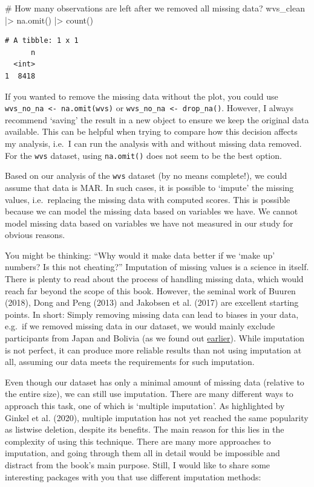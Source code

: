 \documentclass[
  letterpaper,
  DIV=11,
  numbers=noendperiod]{scrreprt}
\newenvironment{Shaded}{\begin{snugshade}}{\end{snugshade}}
\newcommand{\CommentTok}[1]{\textcolor[rgb]{0.37,0.37,0.37}{#1}}
\newcommand{\FunctionTok}[1]{\textcolor[rgb]{0.28,0.35,0.67}{#1}}
\newcommand{\NormalTok}[1]{\textcolor[rgb]{0.00,0.23,0.31}{#1}}
\newcommand{\SpecialCharTok}[1]{\textcolor[rgb]{0.37,0.37,0.37}{#1}}
\begin{document}
\begin{Shaded}
\begin{Highlighting}[]
\CommentTok{\# How many observations are left after we removed all missing data?}
\NormalTok{wvs\_clean }\SpecialCharTok{|\textgreater{}} \FunctionTok{na.omit}\NormalTok{() }\SpecialCharTok{|\textgreater{}} \FunctionTok{count}\NormalTok{()}
\end{Highlighting}
\end{Shaded}

\begin{verbatim}
# A tibble: 1 x 1
      n
  <int>
1  8418
\end{verbatim}

If you wanted to remove the missing data without the plot, you could use
\texttt{wvs\_no\_na\ \textless{}-\ na.omit(wvs)} or
\texttt{wvs\_no\_na\ \textless{}-\ drop\_na()}. However, I always
recommend `saving' the result in a new object to ensure we keep the
original data available. This can be helpful when trying to compare how
this decision affects my analysis, i.e.~I can run the analysis with and
without missing data removed. For the \texttt{wvs} dataset, using
\texttt{na.omit()} does not seem to be the best option.

Based on our analysis of the \texttt{wvs} dataset (by no means
complete!), we could assume that data is MAR. In such cases, it is
possible to `impute' the missing values, i.e.~replacing the missing data
with computed scores. This is possible because we can model the missing
data based on variables we have. We cannot model missing data based on
variables we have not measured in our study for obvious reasons.

You might be thinking: ``Why would it make data better if we `make up'
numbers? Is this not cheating?'' Imputation of missing values is a
science in itself. There is plenty to read about the process of handling
missing data, which would reach far beyond the scope of this book.
However, the seminal work of Buuren (2018), Dong and Peng (2013) and
Jakobsen et al. (2017) are excellent starting points. In short: Simply
removing missing data can lead to biases in your data, e.g.~if we
removed missing data in our dataset, we would mainly exclude
participants from Japan and Bolivia (as we found out
\hyperref[missing-data-by-country-table]{earlier}). While imputation is
not perfect, it can produce more reliable results than not using
imputation at all, assuming our data meets the requirements for such
imputation.

Even though our dataset has only a minimal amount of missing data
(relative to the entire size), we can still use imputation. There are
many different ways to approach this task, one of which is `multiple
imputation'. As highlighted by Ginkel et al. (2020), multiple imputation
has not yet reached the same popularity as listwise deletion, despite
its benefits. The main reason for this lies in the complexity of using
this technique. There are many more approaches to imputation, and going
through them all in detail would be impossible and distract from the
book's main purpose. Still, I would like to share some interesting
packages with you that use different imputation methods:
\end{document}
